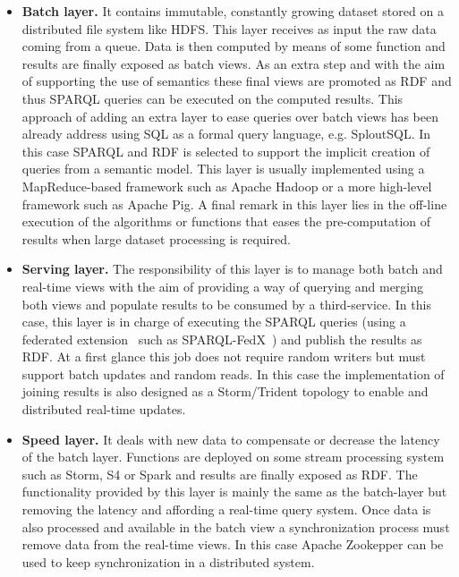 \begin{itemize}
 \item \textbf{Batch layer.} It contains immutable, constantly growing dataset stored on a distributed file system like HDFS. This layer 
 receives as input the raw data coming from a queue. Data is then computed by means of some function and results are finally exposed 
 as batch views. As an extra step and with the aim of supporting the use of semantics these final views are promoted as RDF and thus SPARQL queries 
 can be executed on the computed results. This approach of adding an extra layer to ease queries over batch views has been 
 already address using SQL as a formal query language, e.g. SploutSQL. In this case SPARQL and RDF is selected to support the implicit 
 creation of queries from a semantic model. This layer is usually implemented using a MapReduce-based framework such as Apache Hadoop or 
 a more high-level framework such as Apache Pig. A final remark in this layer lies in the off-line execution of the algorithms or functions 
 that eases the pre-computation of results when large dataset processing is required.
 
 \item \textbf{Serving layer.} The responsibility of this layer is to manage both batch and real-time views 
 with the aim of providing a way of querying and merging both views and populate results to be consumed by 
 a third-service. In this case, this layer is in charge of executing the SPARQL queries (using a federated extension~\cite{DBLP:journals/corr/RakhmawatiUKHH13} 
 such as SPARQL-FedX~\cite{DBLP:conf/esws/SchwarteHHSS11}) and publish the results as RDF. At a first glance this job does not require 
 random writers but must support batch updates and random reads. In this case the implementation of joining 
 results is also designed as a Storm/Trident topology to enable and distributed real-time updates.

\item \textbf{Speed layer.} It deals with new data to compensate or decrease the latency of the batch layer. 
Functions are deployed on some stream processing system such as Storm, S4 or Spark and results are finally 
exposed as RDF. The functionality provided by this layer is mainly the same as the batch-layer but removing 
the latency and affording a real-time query system. Once data is also processed and available in the batch 
view a synchronization process must remove data from the real-time views. In this case Apache Zookepper 
can be used to keep synchronization in a distributed system.
\end{itemize}

